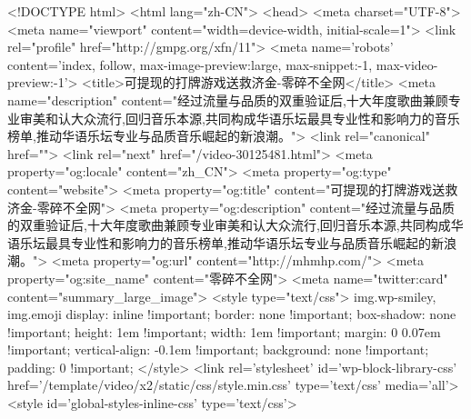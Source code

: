 <!DOCTYPE html>
<html lang="zh-CN">
<head>
    <meta charset="UTF-8">
    <meta name="viewport" content="width=device-width, initial-scale=1">
    <link rel="profile" href="http://gmpg.org/xfn/11">
    <meta name='robots' content='index, follow, max-image-preview:large, max-snippet:-1, max-video-preview:-1'>
    <title>可提现的打牌游戏送救济金-零碎不全网</title>
    <meta name="description" content="经过流量与品质的双重验证后,十大年度歌曲兼顾专业审美和认大众流行,回归音乐本源,共同构成华语乐坛最具专业性和影响力的音乐榜单,推动华语乐坛专业与品质音乐崛起的新浪潮。">
    <link rel="canonical" href="">
    <link rel="next" href="/video-30125481.html">
    <meta property="og:locale" content="zh_CN">
    <meta property="og:type" content="website">
    <meta property="og:title" content="可提现的打牌游戏送救济金-零碎不全网">
    <meta property="og:description" content="经过流量与品质的双重验证后,十大年度歌曲兼顾专业审美和认大众流行,回归音乐本源,共同构成华语乐坛最具专业性和影响力的音乐榜单,推动华语乐坛专业与品质音乐崛起的新浪潮。">
    <meta property="og:url" content="http://mhmhp.com/">
    <meta property="og:site_name" content="零碎不全网">
    <meta name="twitter:card" content="summary_large_image">
    <style type="text/css">
        img.wp-smiley,
        img.emoji {
            display: inline !important;
            border: none !important;
            box-shadow: none !important;
            height: 1em !important;
            width: 1em !important;
            margin: 0 0.07em !important;
            vertical-align: -0.1em !important;
            background: none !important;
            padding: 0 !important;
        }
    </style>
    <link rel='stylesheet' id='wp-block-library-css' href='/template/video/x2/static/css/style.min.css' type='text/css' media='all'>
    <style id='global-styles-inline-css' type='text/css'>
